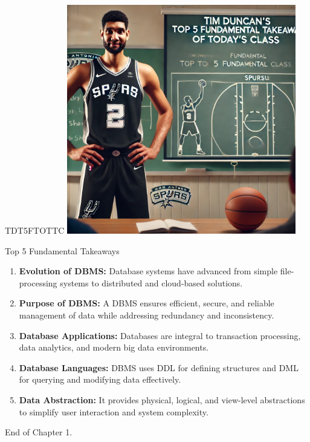\documentclass{beamer}
\begin{document}
\begin{frame}{TDT5FTOTTC}
    \centering
    \includegraphics[width=0.75\textwidth]{figures/tim.png}
\end{frame}

\begin{frame}{Top 5 Fundamental Takeaways}
    \begin{enumerate} \pause
        \item[5] \textbf{Evolution of DBMS:} Database systems have advanced from simple file-processing systems to distributed and cloud-based solutions. \pause
        \item[4] \textbf{Purpose of DBMS:} A DBMS ensures efficient, secure, and reliable management of data while addressing redundancy and inconsistency. \pause
        \item[3] \textbf{Database Applications:} Databases are integral to transaction processing, data analytics, and modern big data environments. \pause
        \item[2] \textbf{Database Languages:} DBMS uses DDL for defining structures and DML for querying and modifying data effectively. \pause
        \item[1] \textbf{Data Abstraction:} It provides physical, logical, and view-level abstractions to simplify user interaction and system complexity. 
    \end{enumerate}
\end{frame}

\begin{frame}{}
    \centering
    \Huge End of Chapter 1.
\end{frame}
\end{document}
